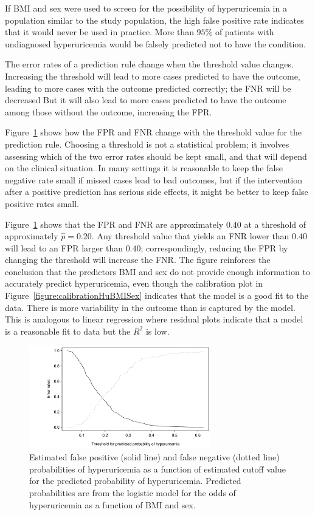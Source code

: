 If BMI and sex were used to screen for the possibility of hyperuricemia in a population similar to the study population, the high false positive rate indicates that it would never be used in practice.  More than $95\%$ of patients with undiagnosed hyperuricemia would be falsely predicted not to have the condition.

The error rates of a prediction rule change when the threshold value changes.  Increasing the threshold will lead to more cases predicted to have the outcome, leading to more cases with the outcome predicted correctly;  the FNR will be decreased  But it will also lead to more cases predicted to have the outcome among those without the outcome, increasing the FPR.

Figure~\ref{figure:fprFNRByCutoffHuBMISex} shows how the FPR and FNR change with the threshold value for the prediction rule.  Choosing a threshold is not a statistical problem; it involves assessing which of the two error rates should be kept small, and that will depend on the clinical situation.  In many settings it is reasonable to keep the false negative rate small if missed cases lead to bad outcomes, but if the intervention after a positive prediction has serious side effects, it might be better to keep false positive rates small.   

Figure~\ref{figure:fprFNRByCutoffHuBMISex} shows that the FPR and FNR are approximately $0.40$ at a threshold of approximately $\hat{p} = 0.20$.  Any threshold value that yields an FNR lower than $0.40$ will lead to an FPR larger than $0.40$;  correspondingly, reducing the FPR by changing the threshold will increase the FNR\@. The figure reinforces the conclusion that the predictors BMI and sex do not provide enough information to accurately predict hyperuricemia, even though the calibration plot in Figure~\ref{figure:calibrationHuBMISex} indicates that the model is a good fit to the data.  There is more variability in the outcome than is captured by the model.  This is analogous to linear regression where residual plots indicate that a model is a reasonable fit to data but the $R^2$ is low.

\begin{figure}[!tbh]
  \centering
  \includegraphics[width=0.70\textwidth]
  {ch_logistic_regression_oi_biostat/figures/fprFNRByCutoffHuBMISex/fprFNRByCutoffHuBMISex.pdf}
    \caption{Estimated false positive (solid line) and false negative (dotted line) probabilities of hyperuricemia as a function of estimated cutoff value for the predicted probability of hyperuricemia.  Predicted probabilities are from the logistic model for the odds of hyperuricemia as a function of BMI and sex.}
    \label{figure:fprFNRByCutoffHuBMISex}
\end{figure}


